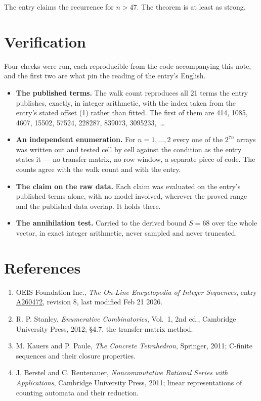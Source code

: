 \documentclass[11pt]{article}
\theoremstyle{definition}
\begin{document}
The entry claims the recurrence for $n > 47$. The theorem is at least as strong.

\section{Verification}

Four checks were run, each reproducible from the code accompanying this note, and the first two are what pin the reading of the entry's English.

\begin{itemize}

\item {\bfseries The published terms.} The walk count reproduces all 21 terms the entry publishes, exactly, in integer arithmetic, with the index taken from the entry's stated offset (1) rather than fitted. The first of them are 414, 1085, 4607, 15502, 57524, 228287, 839073, 3095233,~\dots

\item {\bfseries An independent enumeration.} For $n = 1,\dots,2$ every one of the $2^{7n}$ arrays was written out and tested cell by cell against the condition as the entry states it --- no transfer matrix, no row window, a separate piece of code. The counts agree with the walk count and with the entry.

\item {\bfseries The claim on the raw data.} Each claim was evaluated on the entry's published terms alone, with no model involved, wherever the proved range and the published data overlap. It holds there.

\item {\bfseries The annihilation test.} Carried to the derived bound $S = 68$ over the whole vector, in exact integer arithmetic, never sampled and never truncated.

\end{itemize}

\section{References}

\begin{enumerate}

\item OEIS Foundation Inc., \emph{The On-Line Encyclopedia of Integer Sequences}, entry \href{https://oeis.org/A260472}{A260472}, revision 8, last modified Feb 21 2026.

\item R. P. Stanley, \emph{Enumerative Combinatorics}, Vol.~1, 2nd ed., Cambridge University Press, 2012; \S4.7, the transfer-matrix method.

\item M. Kauers and P. Paule, \emph{The Concrete Tetrahedron}, Springer, 2011; C-finite sequences and their closure properties.

\item J. Berstel and C. Reutenauer, \emph{Noncommutative Rational Series with Applications}, Cambridge University Press, 2011; linear representations of counting automata and their reduction.

\end{enumerate}
\end{document}
